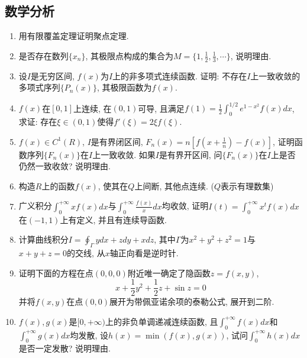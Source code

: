 \documentclass[12pt,a4paper,openany]{book}
\begin{document}
\subsection{数学分析}
\begin{enumerate}
\item 用有限覆盖定理证明聚点定理.

\item 是否存在数列$\{x_n\}$, 其极限点构成的集合为$M = \displaystyle\{1, \frac{1}{2}, \frac{1}{3}, \cdots\}$, 说明理由.

\item 设$I$是无穷区间, $f(x)$为$I$上的非多项式连续函数. 证明: 不存在$I$上一致收敛的多项式序列$\{P_n(x)\}$, 其极限函数为$f(x)$.

\item $f(x)$在$[0,1]$上连续, 在$(0, 1)$可导, 且满足$f(1) = \displaystyle\frac{1}{2}\int_{0}^{1/2}{e^{1-x^2}f(x)dx}$, 求证: 存在$\xi \in (0, 1)$使得$f'(\xi) = 2\xi{}f(\xi)$.

\item $f(x) \in C^1(R)$, $I$是有界闭区间, $\displaystyle{F_n(x) = n[f(x + \frac{1}{n}) - f(x)]}$, 证明函数序列$\{F_n(x)\}$在$I$上一致收敛. 如果$I$是有界开区间, 问$\{F_n(x)\}$在$I$上是否仍然一致收敛? 说明理由.

\item 构造$R$上的函数$f(x)$, 使其在$Q$上间断, 其他点连续. ($Q$表示有理数集)

\item 广义积分$\displaystyle\int_{0}^{+\infty}{xf(x)dx}$与$\displaystyle\int_{0}^{+\infty}{\frac{f(x)}{x}dx}$均收敛, 证明$I(t) = \displaystyle\int_{0}^{+\infty}{x^tf(x)dx}$在$(-1, 1)$上有定义, 并且有连续导函数.

\item 计算曲线积分$I = \displaystyle\oint_{\varGamma}{ydx + zdy + xdz}$, 其中$\varGamma$为$x^2 + y^2 + z^2 = 1$与$x + y + z = 0$的交线, 从$x$轴正向看是逆时针.

\item 证明下面的方程在点$(0, 0, 0)$附近唯一确定了隐函数$z = f(x, y)$,
\[
x + \frac{1}{2}y^2 + \frac{1}{2}z + \sin{z} = 0
\]
并将$f(x, y)$在点$(0, 0)$展开为带佩亚诺余项的泰勒公式, 展开到二阶.

\item $f(x), g(x)$是$[0, +\infty)$上的非负单调递减连续函数, 且$\displaystyle\int_{0}^{+\infty}{f(x)dx}$和$\displaystyle\int_{0}^{+\infty}{g(x)dx}$均发散, 设$h(x) = \min{(f(x), g(x))}$, 试问$\displaystyle\int_{0}^{+\infty}{h(x)dx}$是否一定发散? 说明理由.
\end{enumerate}
\end{document}
